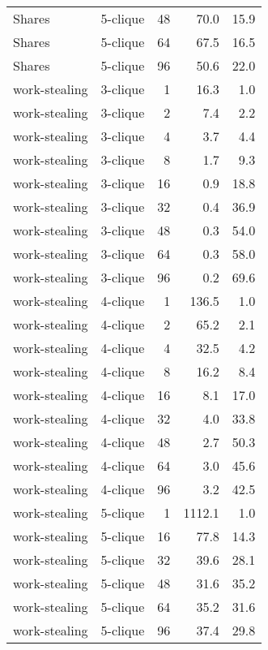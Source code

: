 \begin{longtable}{llr|rr}
        Shares &  5-clique &           48 &    70.0 &     15.9 \\
        Shares &  5-clique &           64 &    67.5 &     16.5 \\
        Shares &  5-clique &           96 &    50.6 &     22.0 \\
 work-stealing &  3-clique &            1 &    16.3 &      1.0 \\
 work-stealing &  3-clique &            2 &     7.4 &      2.2 \\
 work-stealing &  3-clique &            4 &     3.7 &      4.4 \\
 work-stealing &  3-clique &            8 &     1.7 &      9.3 \\
 work-stealing &  3-clique &           16 &     0.9 &     18.8 \\
 work-stealing &  3-clique &           32 &     0.4 &     36.9 \\
 work-stealing &  3-clique &           48 &     0.3 &     54.0 \\
 work-stealing &  3-clique &           64 &     0.3 &     58.0 \\
 work-stealing &  3-clique &           96 &     0.2 &     69.6 \\
 work-stealing &  4-clique &            1 &   136.5 &      1.0 \\
 work-stealing &  4-clique &            2 &    65.2 &      2.1 \\
 work-stealing &  4-clique &            4 &    32.5 &      4.2 \\
 work-stealing &  4-clique &            8 &    16.2 &      8.4 \\
 work-stealing &  4-clique &           16 &     8.1 &     17.0 \\
 work-stealing &  4-clique &           32 &     4.0 &     33.8 \\
 work-stealing &  4-clique &           48 &     2.7 &     50.3 \\
 work-stealing &  4-clique &           64 &     3.0 &     45.6 \\
 work-stealing &  4-clique &           96 &     3.2 &     42.5 \\
 work-stealing &  5-clique &            1 &  1112.1 &      1.0 \\
 work-stealing &  5-clique &           16 &    77.8 &     14.3 \\
 work-stealing &  5-clique &           32 &    39.6 &     28.1 \\
 work-stealing &  5-clique &           48 &    31.6 &     35.2 \\
 work-stealing &  5-clique &           64 &    35.2 &     31.6 \\
 work-stealing &  5-clique &           96 &    37.4 &     29.8 \\
\end{longtable}
